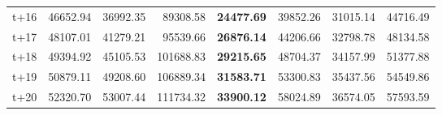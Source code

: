 \begin{table}[H]
\begin{tabular}{lrrrrrrr}
t+16  & 46652.94  & 36992.35  & 89308.58  & \textbf{24477.69}  & 39852.26  & 31015.14  & 44716.49  \\
t+17  & 48107.01  & 41279.21  & 95539.66  & \textbf{26876.14}  & 44206.66  & 32798.78  & 48134.58  \\
t+18  & 49394.92  & 45105.53  & 101688.83  & \textbf{29215.65}  & 48704.37  & 34157.99  & 51377.88  \\
t+19  & 50879.11  & 49208.60  & 106889.34  & \textbf{31583.71}  & 53300.83  & 35437.56  & 54549.86  \\
t+20  & 52320.70  & 53007.44  & 111734.32  & \textbf{33900.12}  & 58024.89  & 36574.05  & 57593.59  \\

\bottomrule
\end{tabular}
\end{table}
